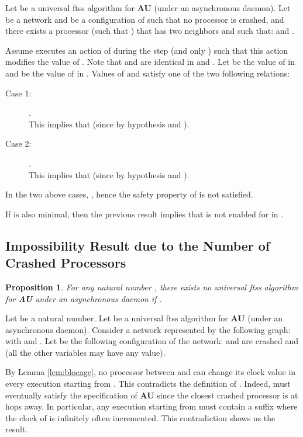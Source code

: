 \documentclass[11pt,english,letterpaper]{article}
\newtheorem{proposition}{Proposition}
\newenvironment{proof}{{\noindent\bf Proof. } }{{\hfill }}
\begin{document}
\begin{proof}
Let  be a universal ftss algorithm for \textbf{AU} (under an asynchronous daemon). Let  be a network and  be a configuration of  such that no processor is crashed,  and there exists a processor  (such that ) that has two neighbors  and  such that:  and .

Assume  executes an action of  during the step  (and only ) such that this action modifies the value of . Note that  and  are identical in  and . Let  be the value of  in  and  be the value of  in . Values of  and  satisfy one of the two following relations:

\begin{description}
\item[Case 1:] .\\
This implies that  (since  by hypothesis and ).
\item[Case 2:] .\\
This implies that  (since  by hypothesis and ).
\end{description} 

In the two above cases, , hence the safety property of  is not satisfied.

If  is also minimal, then the previous result implies that   is not enabled for  in .
\end{proof}

\subsection{Impossibility Result due to the Number of Crashed Processors}

\begin{proposition}\label{prop:impf2}
For any natural number , there exists no universal ftss algorithm for \textbf{AU} under an asynchronous daemon if .
\end{proposition}

\begin{proof}
Let  be a natural number. Let  be a universal ftss algorithm for \textbf{AU} (under an asynchronous daemon). Consider a network represented by the following graph:  with  and .	Let  be the following configuration of the network:  and  are crashed and  		(all the other variables may have any value).

By Lemma \ref{lem:blocage}, no processor between  and  can change its clock value in every execution starting from . This contradicts the definition of . Indeed,  must eventually satisfy the specification of \textbf{AU} since the closest crashed processor is at  hops away. In particular, any execution starting from  must contain a suffix where the clock of  is infinitely often incremented. This contradiction shows us the result.
\end{proof}
\end{document}
